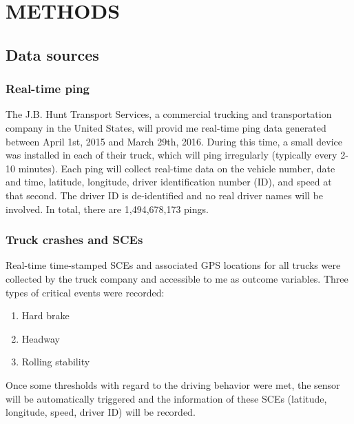\documentclass[12pt]{book}
\numberwithin{equation}{chapter}
\providecommand{\tightlist}{%
  \setlength{\itemsep}{0pt}\setlength{\parskip}{0pt}}
\begin{document}
\hypertarget{methods}{%
\chapter{METHODS}\label{methods}}

\hypertarget{data-sources}{%
\section{Data sources}\label{data-sources}}

\hypertarget{real-time-ping}{%
\subsection{Real-time ping}\label{real-time-ping}}

The J.B. Hunt Transport Services, a commercial trucking and transportation company in the United States, will provid me real-time ping data generated between April 1st, 2015 and March 29th, 2016. During this time, a small device was installed in each of their truck, which will ping irregularly (typically every 2-10 minutes). Each ping will collect real-time data on the vehicle number, date and time, latitude, longitude, driver identification number (ID), and speed at that second. The driver ID is de-identified and no real driver names will be involved. In total, there are 1,494,678,173 pings.

\hypertarget{truck-crashes-and-sces}{%
\subsection{Truck crashes and SCEs}\label{truck-crashes-and-sces}}

Real-time time-stamped SCEs and associated GPS locations for all trucks were collected by the truck company and accessible to me as outcome variables. Three types of critical events were recorded:

\begin{enumerate}
\def\labelenumi{\arabic{enumi}.}
\tightlist
\item
  Hard brake
\item
  Headway
\item
  Rolling stability
\end{enumerate}

Once some thresholds with regard to the driving behavior were met, the sensor will be automatically triggered and the information of these SCEs (latitude, longitude, speed, driver ID) will be recorded.
\end{document}
